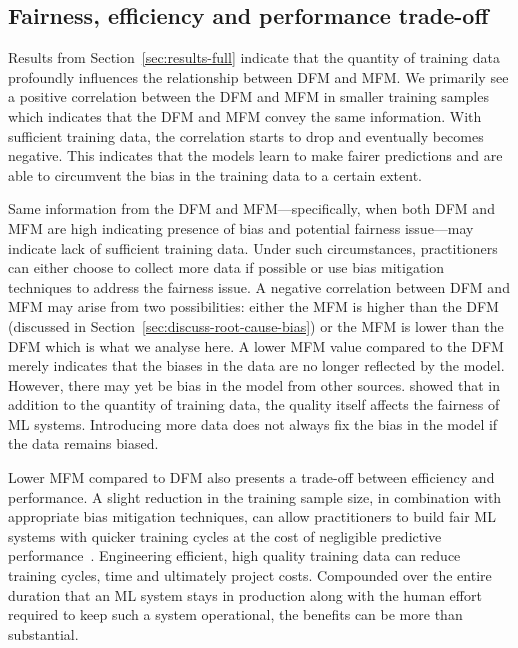 \documentclass{article}
\begin{document}


\subsection{Fairness, efficiency and performance trade-off}\label{sec:discuss-fair-eff-perf-trade}

Results from Section \ref{sec:results-full} indicate that the quantity
of training data profoundly influences the relationship between DFM
and MFM. We primarily see a positive correlation between the DFM and
MFM in smaller training samples which indicates that the DFM and MFM
convey the same information. With sufficient training data, the
correlation starts to drop and eventually becomes negative. This
indicates that the models learn to make fairer predictions and are
able to circumvent the bias in the training data to a certain extent.

Same information from the DFM and MFM---specifically, when both DFM
and MFM are high indicating presence of bias and potential fairness
issue---may indicate lack of sufficient training data. Under such
circumstances, practitioners can either choose to collect more data if
possible or use bias mitigation techniques to address the fairness
issue. A negative correlation between DFM and MFM may arise from two
possibilities: either the MFM is higher than the DFM (discussed in
Section \ref{sec:discuss-root-cause-bias}) or the MFM is lower than
the DFM which is what we analyse here. A lower MFM value compared to
the DFM merely indicates that the biases in the data are no longer
reflected by the model. However, there may yet be bias in the model
from other sources. \citeauthor{zhang2021ignorance} showed that in
addition to the quantity of training data, the quality itself affects
the fairness of ML systems. Introducing more data does not always fix
the bias in the model if the data remains biased.

Lower MFM compared to DFM also presents a trade-off between efficiency
and performance. A slight reduction in the training sample size, in
combination with appropriate bias mitigation techniques, can allow
practitioners to build fair ML systems with quicker training cycles at
the cost of negligible predictive performance \cite{verdecchia2022data}.
Engineering efficient, high quality training data can reduce training
cycles, time and ultimately project costs. Compounded over the entire
duration that an ML system stays in production along with the human
effort required to keep such a system operational, the benefits can be
more than substantial.
\end{document}

